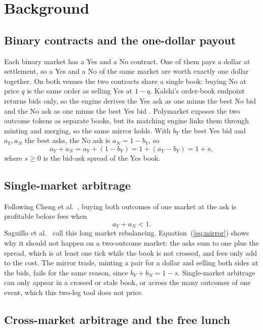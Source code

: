 \documentclass[5p,letterpaper]{elsarticle}
\begin{document}
\section{Background}\label{sec:background}

\subsection{Binary contracts and the one-dollar payout}

Each binary market has a Yes and a No contract. One of them pays a dollar at settlement, so a Yes and a No of the same market are worth exactly one dollar together. On both venues the two contracts share a single book: buying No at price $q$ is the same order as selling Yes at $1-q$. Kalshi's order-book endpoint returns bids only, so the engine derives the Yes ask as one minus the best No bid and the No ask as one minus the best Yes bid \cite{kalshibook}. Polymarket exposes the two outcome tokens as separate books, but its matching engine links them through minting and merging, so the same mirror holds. With $b_Y$ the best Yes bid and $a_Y, a_N$ the best asks, the No ask is $a_N = 1 - b_Y$, so
\begin{equation}\label{eq:mirror}
a_Y + a_N = a_Y + (1-b_Y) = 1 + (a_Y - b_Y) = 1 + s,
\end{equation}
where $s \ge 0$ is the bid-ask spread of the Yes book.

\subsection{Single-market arbitrage}

Following Cheng et al.\ \cite{cheng2026}, buying both outcomes of one market at the ask is profitable before fees when
\begin{equation}\label{eq:single}
a_Y + a_N < 1 .
\end{equation}
Saguillo et al.\ \cite{saguillo2025} call this long market rebalancing. Equation~(\ref{eq:mirror}) shows why it should not happen on a two-outcome market: the asks sum to one plus the spread, which is at least one tick while the book is not crossed, and fees only add to the cost. The mirror trade, minting a pair for a dollar and selling both sides at the bids, fails for the same reason, since $b_Y + b_N = 1 - s$. Single-market arbitrage can only appear in a crossed or stale book, or across the many outcomes of one event, which this two-leg tool does not price.

\subsection{Cross-market arbitrage and the free lunch}
\end{document}
